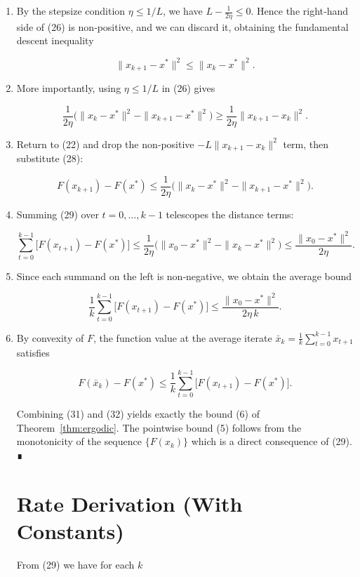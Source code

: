 \documentclass{article}
\begin{document}
\begin{enumerate}
\[
\frac{1}{2\eta}\bigl(\|x_{k}-x^{*}\|^{2}-\|x_{k+1}-x^{*}\|^{2}\bigr)
\le
\Bigl(L-\frac{1}{2\eta}\Bigr)\|x_{k+1}-x_{k}\|^{2}.
\tag{26}
\]

\item[Step 16.] By the stepsize condition $\eta\le 1/L$, we have $L-\frac{1}{2\eta}\le 0$.  Hence the right‑hand side of (26) is non‑positive, and we can discard it, obtaining the fundamental descent inequality

\[
\|x_{k+1}-x^{*}\|^{2}\le \|x_{k}-x^{*}\|^{2}.
\tag{27}
\]

\item[Step 17.] More importantly, using $\eta\le 1/L$ in (26) gives

\[
\frac{1}{2\eta}\bigl(\|x_{k}-x^{*}\|^{2}-\|x_{k+1}-x^{*}\|^{2}\bigr)
\ge \frac{1}{2\eta}\|x_{k+1}-x_{k}\|^{2}.
\tag{28}
\]

\item[Step 18.] Return to (22) and drop the non‑positive $-L\|x_{k+1}-x_{k}\|^{2}$ term, then substitute (28):

\[
F(x_{k+1})-F(x^{*})
\le
\frac{1}{2\eta}\bigl(\|x_{k}-x^{*}\|^{2}-\|x_{k+1}-x^{*}\|^{2}\bigr).
\tag{29}
\]

\item[Step 19.] Summing (29) over $t=0,\dots,k-1$ telescopes the distance terms:

\[
\sum_{t=0}^{k-1}\bigl[F(x_{t+1})-F(x^{*})\bigr]
\le
\frac{1}{2\eta}\bigl(\|x_{0}-x^{*}\|^{2}-\|x_{k}-x^{*}\|^{2}\bigr)
\le
\frac{\|x_{0}-x^{*}\|^{2}}{2\eta}.
\tag{30}
\]

\item[Step 20.] Since each summand on the left is non‑negative, we obtain the average bound

\[
\frac{1}{k}\sum_{t=0}^{k-1}\bigl[F(x_{t+1})-F(x^{*})\bigr]
\le
\frac{\|x_{0}-x^{*}\|^{2}}{2\eta\,k}.
\tag{31}
\]

\item[Step 21.] By convexity of $F$, the function value at the average iterate $\bar x_{k}=\frac1k\sum_{t=0}^{k-1}x_{t+1}$ satisfies  

\[
F(\bar x_{k})-F(x^{*})\le 
\frac{1}{k}\sum_{t=0}^{k-1}\bigl[F(x_{t+1})-F(x^{*})\bigr].
\tag{32}
\]

Combining (31) and (32) yields exactly the bound (6) of Theorem~\ref{thm:ergodic}.  The pointwise bound (5) follows from the monotonicity of the sequence $\{F(x_{k})\}$ which is a direct consequence of (29).  ∎

\section*{Rate Derivation (With Constants)}
From (29) we have for each $k$  


\end{enumerate}
\end{document}
